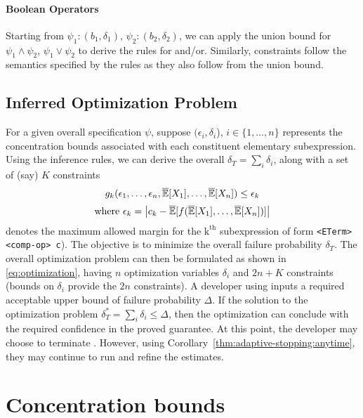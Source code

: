 \begin{subappendices}
\paragraph{Boolean Operators}
Starting from $\psi_1: (b_1, \delta_1)$, $\psi_2: (b_2, \delta_2)$, we can apply the union bound for $\psi_1 \wedge \psi_2$, $\psi_1 \vee \psi_2$ to derive the rules for and/or.
Similarly, constraints follow the semantics specified by the rules as they also follow from the union bound.




\subsection{Inferred Optimization Problem}
\label{sec:appendix:inferrence-rules:opt}
For a given overall specification $\psi$, suppose $(\epsilon_i, \delta_i$), $i \in \{1, \dots, n\}$ represents the concentration bounds associated with each constituent elementary subexpression. 
Using the inference rules, we can derive the overall $\delta_T = \sum\limits_{i}\delta_i$, along with a set of (say) $K$ constraints 
\[
g_k(\epsilon_{1}, \dots, \epsilon_{n}, \overline{\mathbb{E}}[X_1], \dots, \overline{\mathbb{E}}[X_n]) \leq \epsilon_k
\]
\[
\text{where } \epsilon_k = \left|c_k - \overline{\mathbb{E}}[f(\overline{\mathbb{E}}[X_1], \dots, \overline{\mathbb{E}}[X_n])]\right|
\]
denotes the maximum allowed margin for the $\text{k}^{\text{th}}$ subexpression of form \texttt{<ETerm> <comp-op> c}).
The objective is to minimize the overall failure probability $\delta_T$.
The overall optimization problem can then be formulated as shown in \ref{eq:optimization},
having $n$ optimization variables $\delta_i$ and $2n + K$ constraints (bounds on $\delta_i$ provide the $2n$ constraints).  
A developer using \AVOIRmethodname{} inputs a required acceptable upper bound of failure probability $\Delta$.
If the solution to the optimization problem $\delta_T^* = \sum_i \delta_i \leq \Delta$, then the optimization can conclude with the required confidence in the proved guarantee.
At this point, the developer may choose to terminate \AVOIRmethodname{}.
However, using Corollary~\ref{thm:adaptive-stopping:anytime}, they may continue to run and refine the estimates.



\section{Concentration bounds}


\end{subappendices}
